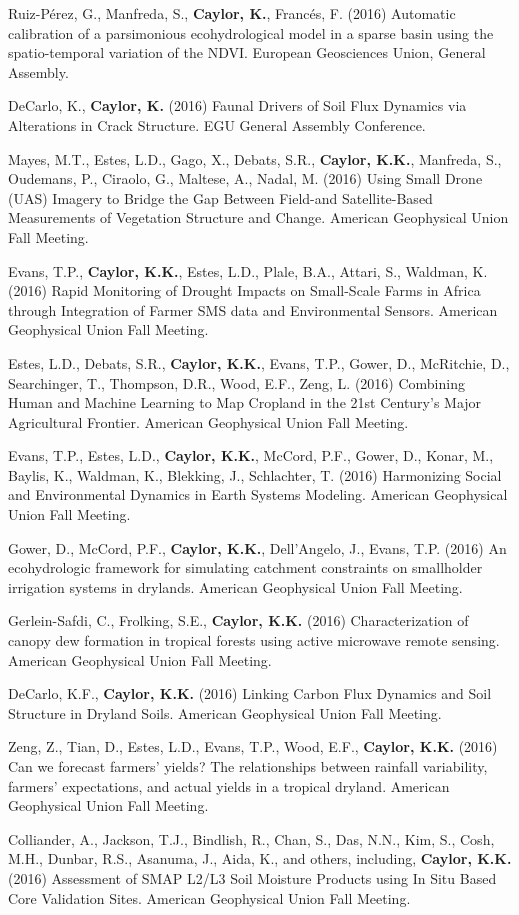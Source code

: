 \begin{etaremune}
\item Ruiz-P\'erez, G., Manfreda, S., \textbf{ Caylor, K.}, Franc\'es, F. (2016) Automatic calibration of a parsimonious ecohydrological model in a sparse basin using the spatio-temporal variation of the NDVI. European Geosciences Union, General Assembly.
\item DeCarlo, K., \textbf{ Caylor, K.} (2016) Faunal Drivers of Soil Flux Dynamics via Alterations in Crack Structure. EGU General Assembly Conference.
\item Mayes, M.T., Estes, L.D., Gago, X., Debats, S.R., \textbf{ Caylor, K.K.}, Manfreda, S., Oudemans, P., Ciraolo, G., Maltese, A., Nadal, M. (2016) Using Small Drone (UAS) Imagery to Bridge the Gap Between Field-and Satellite-Based Measurements of Vegetation Structure and Change. American Geophysical Union Fall Meeting.
\item Evans, T.P., \textbf{ Caylor, K.K.}, Estes, L.D., Plale, B.A., Attari, S., Waldman, K. (2016) Rapid Monitoring of Drought Impacts on Small-Scale Farms in Africa through Integration of Farmer SMS data and Environmental Sensors. American Geophysical Union Fall Meeting.
\item Estes, L.D., Debats, S.R., \textbf{ Caylor, K.K.}, Evans, T.P., Gower, D., McRitchie, D., Searchinger, T., Thompson, D.R., Wood, E.F., Zeng, L. (2016) Combining Human and Machine Learning to Map Cropland in the 21st Century's Major Agricultural Frontier. American Geophysical Union Fall Meeting.
\item Evans, T.P., Estes, L.D., \textbf{ Caylor, K.K.}, McCord, P.F., Gower, D., Konar, M., Baylis, K., Waldman, K., Blekking, J., Schlachter, T. (2016) Harmonizing Social and Environmental Dynamics in Earth Systems Modeling. American Geophysical Union Fall Meeting.
\item Gower, D., McCord, P.F., \textbf{ Caylor, K.K.}, Dell'Angelo, J., Evans, T.P. (2016) An ecohydrologic framework for simulating catchment constraints on smallholder irrigation systems in drylands. American Geophysical Union Fall Meeting.
\item Gerlein-Safdi, C., Frolking, S.E., \textbf{ Caylor, K.K.} (2016) Characterization of canopy dew formation in tropical forests using active microwave remote sensing. American Geophysical Union Fall Meeting.
\item DeCarlo, K.F., \textbf{ Caylor, K.K.} (2016) Linking Carbon Flux Dynamics and Soil Structure in Dryland Soils. American Geophysical Union Fall Meeting.
\item Zeng, Z., Tian, D., Estes, L.D., Evans, T.P., Wood, E.F., \textbf{ Caylor, K.K.} (2016) Can we forecast farmers' yields? The relationships between rainfall variability, farmers' expectations, and actual yields in a tropical dryland. American Geophysical Union Fall Meeting.
\item Colliander, A., Jackson, T.J., Bindlish, R., Chan, S., Das, N.N., Kim, S., Cosh, M.H., Dunbar, R.S., Asanuma, J., Aida, K., and others, including, \textbf{ Caylor, K.K.} (2016) Assessment of SMAP L2/L3 Soil Moisture Products using In Situ Based Core Validation Sites. American Geophysical Union Fall Meeting.


\end{etaremune}
